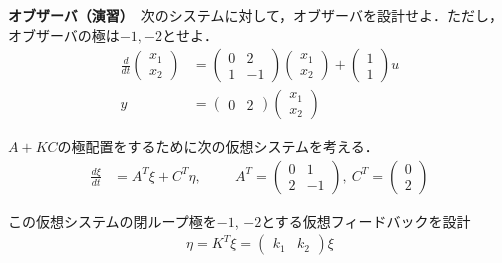 \documentclass[a4paper,11pt]{jreport}
\begin{document}
\newpage
\noindent
{\bf オブザーバ（演習）}　次のシステムに対して，オブザーバを設計せよ．ただし，オブザーバの極は$-1,-2$とせよ．
\begin{align*}
	\frac{d}{dt}
	\left (
	\begin{array}{c}
	 x_1 \\ x_2 
	\end{array}
	\right )
	& = 
	\left (
	\begin{array}{cc}
	 0 & 2 \\
	 1 & -1
	\end{array}
	\right )
	\left (
	\begin{array}{c}
	 x_1 \\ x_2 
	\end{array}
	\right )
	+
	\left (
	\begin{array}{c}
	 1 \\ 1 
	\end{array}
	\right )
	u
\\
	y&=
	\left ( \begin{array}{cc}
		0 & 2 
	\end{array} \right )
	\left (	\begin{array}{c}
		x_1 \\ x_2 
	\end{array} \right )
\end{align*}

$A+KC$の極配置をするために次の仮想システムを考える．
\begin{align*}
 \frac{d \xi}{dt} & = A^T \xi + C^T \eta, 
\hspace{1cm}
	A^T =
	\left (
	\begin{array}{cc}
	 0 & 1 \\
	 2 & -1
	\end{array}
	\right )
	, \ 
	C^T = 
	\left (
	\begin{array}{c}
	 0 \\ 2 
	\end{array}
	\right )
\end{align*}

この仮想システムの閉ループ極を$-1$, $-2$とする仮想フィードバックを設計
\begin{align*}
 \eta =  K^T \xi
	=
	\left ( \begin{array}{cc}
		k_1 & k_2 
	\end{array} \right )
	\xi
\end{align*}
\end{document}
